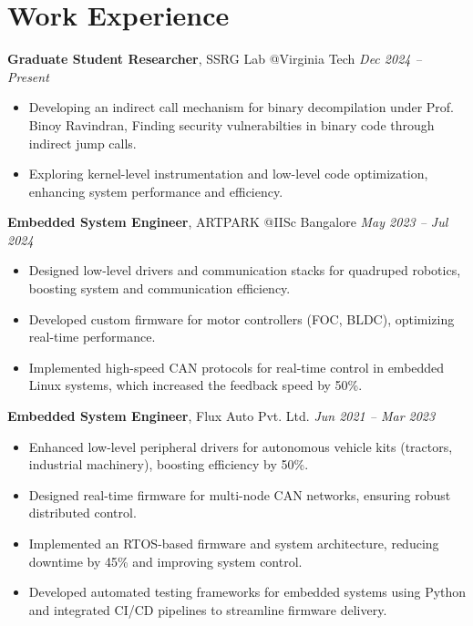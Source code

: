 \documentclass[10pt, letterpaper]{article}
\newenvironment{onecolentry}{\begin{adjustwidth}{0pt}{0pt}}{\end{adjustwidth}}
\newenvironment{highlights}{\begin{itemize}[leftmargin=10pt, itemsep=-2pt]}{\end{itemize}}
\begin{document}
\section{Work Experience}
\begin{onecolentry}

\textbf{Graduate Student Researcher}, SSRG Lab @Virginia Tech \hfill \textit{Dec 2024 -- Present}
\begin{highlights}
    \item Developing an indirect call mechanism for binary decompilation under Prof. Binoy Ravindran, Finding security vulnerabilties in binary code through indirect jump calls.
    \item Exploring kernel-level instrumentation and low-level code optimization, enhancing system performance and efficiency.
\end{highlights}

\textbf{Embedded System Engineer}, ARTPARK @IISc Bangalore \hfill \textit{May 2023 -- Jul 2024}
\begin{highlights}
    \item Designed low-level drivers and communication stacks for quadruped robotics, boosting system and communication efficiency.
    \item Developed custom firmware for motor controllers (FOC, BLDC), optimizing real-time performance.
    \item Implemented high-speed CAN protocols for real-time control in embedded Linux systems, which increased the feedback speed by 50\%.
\end{highlights}

\textbf{Embedded System Engineer}, Flux Auto Pvt. Ltd. \hfill \textit{Jun 2021 -- Mar 2023}
\begin{highlights}
    \item Enhanced low-level peripheral drivers for autonomous vehicle kits (tractors, industrial machinery), boosting efficiency by 50\%.
    \item Designed real-time firmware for multi-node CAN networks, ensuring robust distributed control.
    \item Implemented an RTOS-based firmware and system architecture, reducing downtime by 45\% and improving system control.
    \item Developed automated testing frameworks for embedded systems using Python and integrated CI/CD pipelines to streamline firmware delivery.
\end{highlights}


\end{onecolentry}
\end{document}
